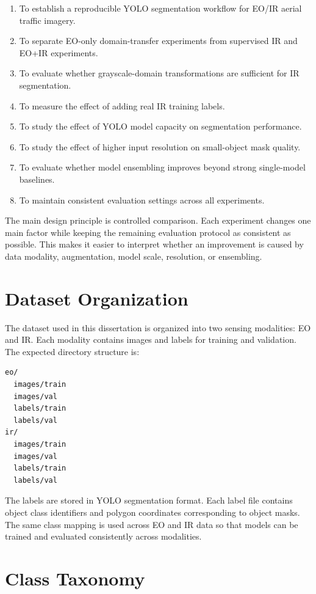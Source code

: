 \begin{enumerate}
    \item To establish a reproducible YOLO segmentation workflow for EO/IR aerial traffic imagery.
    \item To separate EO-only domain-transfer experiments from supervised IR and EO+IR experiments.
    \item To evaluate whether grayscale-domain transformations are sufficient for IR segmentation.
    \item To measure the effect of adding real IR training labels.
    \item To study the effect of YOLO model capacity on segmentation performance.
    \item To study the effect of higher input resolution on small-object mask quality.
    \item To evaluate whether model ensembling improves beyond strong single-model baselines.
    \item To maintain consistent evaluation settings across all experiments.
\end{enumerate}

The main design principle is controlled comparison. Each experiment changes one main factor while keeping the remaining evaluation protocol as consistent as possible. This makes it easier to interpret whether an improvement is caused by data modality, augmentation, model scale, resolution, or ensembling.

\section{Dataset Organization}

The dataset used in this dissertation is organized into two sensing modalities: EO and IR. Each modality contains images and labels for training and validation. The expected directory structure is:

\begin{verbatim}
eo/
  images/train
  images/val
  labels/train
  labels/val
ir/
  images/train
  images/val
  labels/train
  labels/val
\end{verbatim}

The labels are stored in YOLO segmentation format. Each label file contains object class identifiers and polygon coordinates corresponding to object masks. The same class mapping is used across EO and IR data so that models can be trained and evaluated consistently across modalities.

\section{Class Taxonomy}

